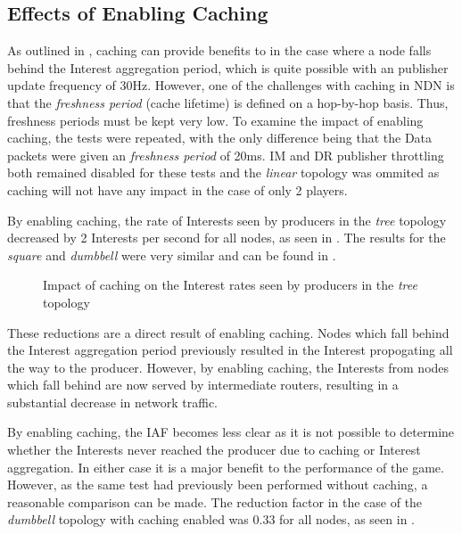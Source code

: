 \subsection{Effects of Enabling Caching}
As outlined in , caching can provide benefits to \game{} in the case where a node falls behind the Interest aggregation period, which is quite possible with an publisher update frequency of 30Hz. However, one of the challenges with caching in NDN is that the \textit{freshness period} (cache lifetime) is defined on a hop-by-hop basis. Thus, freshness periods must be kept very low. To examine the impact of enabling caching, the tests were repeated, with the only difference being that the Data packets were given an \textit{freshness period} of 20ms. IM and DR publisher throttling both remained disabled for these tests and the \textit{linear} topology was ommited as caching will not have any impact in the case of only 2 players.

By enabling caching, the rate of Interests seen by producers in the \textit{tree} topology decreased by 2 Interests per second for all nodes, as seen in . The results for the \textit{square} and \textit{dumbbell} were very similar and can be found in .

\begin{figure}[H]
    \centering
    \caption{Impact of caching on the Interest rates seen by producers in the \textit{tree} topology}
    \label{fig:eval:caching:interest-impact-tree}
\end{figure}

These reductions are a direct result of enabling caching. Nodes which fall behind the Interest aggregation period previously resulted in the Interest propogating all the way to the producer. However, by enabling caching, the Interests from nodes which fall behind are now served by intermediate routers, resulting in a substantial decrease in network traffic.

By enabling caching, the IAF becomes less clear as it is not possible to determine whether the Interests never reached the producer due to caching or Interest aggregation. In either case it is a major benefit to the performance of the game. However, as the same test had previously been performed without caching, a reasonable comparison can be made. The reduction factor in the case of the \textit{dumbbell} topology with caching enabled was 0.33 for all nodes, as seen in .  

